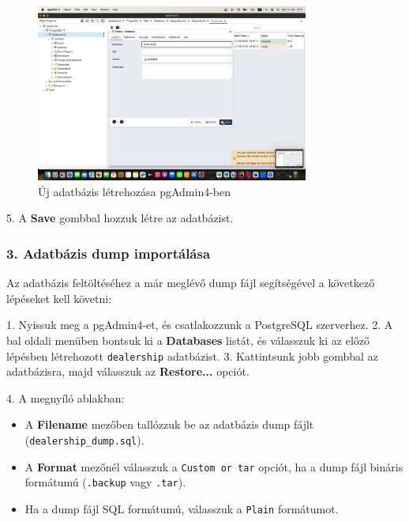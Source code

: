 \documentclass{report}[11pt]
\begin{document}
\begin{figure}[H]
    \centering
    \includegraphics[width=0.8\textwidth]{figures/db_create.png}
    \caption{Új adatbázis létrehozása pgAdmin4-ben}
    \label{fig:create_db}
\end{figure}

5. A \textbf{Save} gombbal hozzuk létre az adatbázist.

\subsubsection{3. Adatbázis dump importálása}

Az adatbázis feltöltéséhez a már meglévő dump fájl segítségével a következő lépéseket kell követni:

1. Nyissuk meg a pgAdmin4-et, és csatlakozzunk a PostgreSQL szerverhez.
2. A bal oldali menüben bontsuk ki a \textbf{Databases} listát, és válasszuk ki az előző lépésben létrehozott \texttt{dealership} adatbázist.
3. Kattintsunk jobb gombbal az adatbázisra, majd válasszuk az \textbf{Restore...} opciót.


4. A megnyíló ablakban:
   \begin{itemize}
       \item A \textbf{Filename} mezőben tallózzuk be az adatbázis dump fájlt (\texttt{dealership\_dump.sql}).
       \item A \textbf{Format} mezőnél válasszuk a \texttt{Custom or tar} opciót, ha a dump fájl bináris formátumú (\texttt{.backup} vagy \texttt{.tar}).
       \item Ha a dump fájl SQL formátumú, válasszuk a \texttt{Plain} formátumot.
   \end{itemize}
\end{document}
